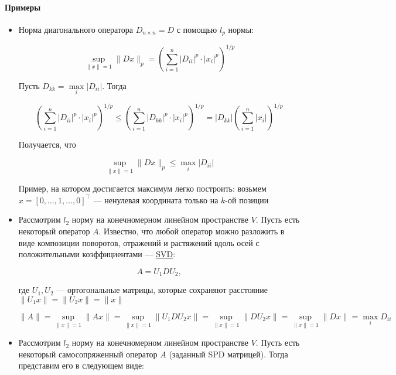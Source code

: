 \paragraph{Примеры}

\begin{itemize}
    \item Норма диагонального оператора $D_{n \times n} = D$ с помощью $l_p$ нормы:

    \[
    \sup\limits_{\lVert x \rVert = 1} \lVert Dx \rVert_p = \left(\sum\limits_{i = 1}^n |D_{ii}|^p \cdot |x_i|^p\right)^{1/p}
    \]

    Пусть $D_{kk} = \max\limits_{i} |D_{ii}|$. Тогда

    \[
    \left(\sum\limits_{i = 1}^n |D_{ii}|^p \cdot |x_i|^p\right)^{1/p} \leqslant \left(\sum\limits_{i = 1}^n |D_{kk}|^p \cdot |x_i|^p\right)^{1/p} = |D_{kk}| \left(\sum\limits_{i = 1}^n |x_i|\right)^{1/p}
    \]

    Получается, что

    \[
    \sup\limits_{\lVert x \rVert = 1} \lVert Dx \rVert_p \leqslant \max\limits_{i} |D_{ii}|
    \]

    Пример, на котором достигается максимум легко построить: возьмем $x = [0, \ldots, 1, \ldots, 0]^{\top}$ --- ненулевая координата только на $k$-ой позиции

    \item Рассмотрим $l_2$ норму на конечномерном линейном пространстве $V$. Пусть есть некоторый оператор $A$. Известно, что любой оператор можно разложить в виде композиции поворотов, отражений и растяжений вдоль осей с положительными коэффициентами --- \href{https://en.wikipedia.org/wiki/Singular_value_decomposition}{SVD}:

    \[
    A = U_1 D U_2,
    \]

    где $U_1, U_2$ --- ортогональные матрицы, которые сохраняют расстояние $\lVert U_1 x \rVert = \lVert U_2 x \rVert = \lVert x \rVert$

    \[
    \lVert A \rVert = \sup\limits_{\lVert x \rVert = 1} \lVert A x \rVert = \sup\limits_{\lVert x \rVert = 1} \lVert U_1 D U_2 x \rVert =  \sup\limits_{\lVert x \rVert = 1} \lVert D U_2 x \rVert =  \sup\limits_{\lVert x \rVert = 1} \lVert D x \rVert = \max\limits_{i} D_{ii}
    \]

    \item Рассмотрим $l_2$ норму на конечномерном линейном пространстве $V$. Пусть есть некоторый самосопряженный оператор $A$ (заданный SPD матрицей). Тогда представим его в следующем виде:


\end{itemize}
